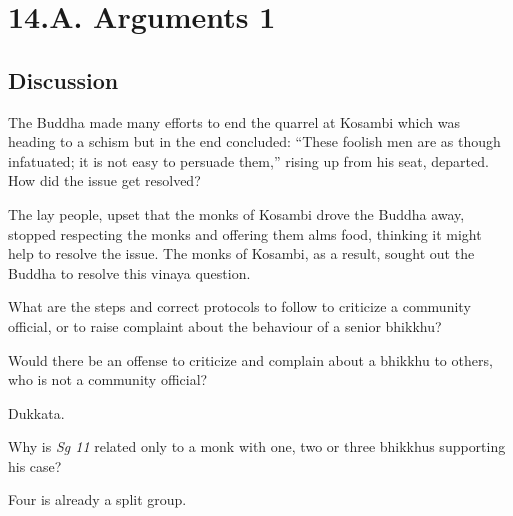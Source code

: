 \chapter{14.A. Arguments 1}
\renewcommand*{\theChapterTitle}{14.A. Arguments 1}

\section*{Discussion}


The Buddha made many efforts to end the quarrel at Kosambi which was heading to
a schism but in the end concluded: “These foolish men are as though infatuated;
it is not easy to persuade them,” rising up from his seat, departed. How did the
issue get resolved?

\begin{solution}
  The lay people, upset that the monks of Kosambi drove the Buddha away,
  stopped respecting the monks and offering them alms food, thinking it might
  help to resolve the issue. The monks of Kosambi, as a result, sought out the
  Buddha to resolve this vinaya question.
\end{solution}

\bigskip

What are the steps and correct protocols to follow to criticize a community
official, or to raise complaint about the behaviour of a senior bhikkhu?

\bigskip

Would there be an offense to criticize and complain about a bhikkhu to others, who is not a community official?

\begin{solution}
  Dukkata.
\end{solution}

\bigskip


Why is \emph{Sg 11} related only to a monk with one, two or three bhikkhus supporting his case?

\bigskip

\begin{solution}
  Four is already a split group.
\end{solution}

